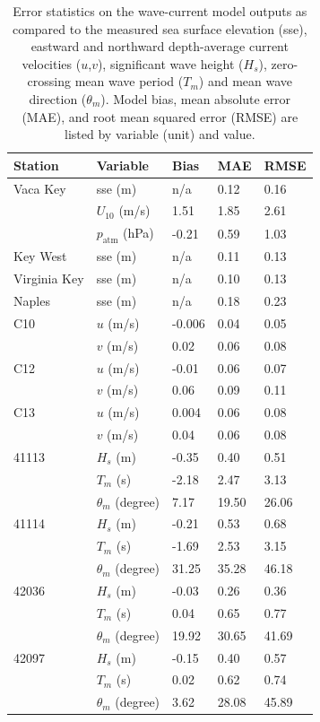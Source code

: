 \documentclass[preprint,12pt,authoryear]{elsarticle}
\begin{document}
\begin{table}
    \centering
    \begin{tabular}{|p{3cm}p{3cm}p{2cm}p{2cm}p{2cm}|}
        \hline
        \textbf{Station} & \textbf{Variable} & \textbf{Bias} & \textbf{MAE} & \textbf{RMSE} \\
        \hline
        Vaca Key     & sse (m)        & n/a  & 0.12 & 0.16 \\
                     & $U_{10}$ (m/s) & 1.51 & 1.85 & 2.61 \\
                     & $p_\text{atm}$ (hPa) & -0.21 & 0.59 & 1.03 \\ 
        Key West     & sse (m)        & n/a  & 0.11 & 0.13 \\
        Virginia Key & sse (m)        & n/a  & 0.10 & 0.13 \\
        Naples       & sse (m)        & n/a  & 0.18 & 0.23 \\
        \hline
        C10  & $u$ (m/s) & -0.006 & 0.04 & 0.05 \\
             & $v$ (m/s) & 0.02   & 0.06 & 0.08 \\
        C12  & $u$ (m/s) & -0.01  & 0.06 & 0.07 \\
             & $v$ (m/s) & 0.06   & 0.09 & 0.11 \\
        C13  & $u$ (m/s) & 0.004  & 0.06 & 0.08 \\
             & $v$ (m/s) & 0.04   & 0.06 & 0.08 \\
        \hline
        41113 & $H_s$ (m) & -0.35 & 0.40 & 0.51 \\
              & $T_m$ (s) & -2.18 & 2.47 & 3.13 \\
              & $\theta_m$ (degree) & 7.17 & 19.50 & 26.06 \\
        41114 & $H_s$ (m) & -0.21 & 0.53 & 0.68 \\
              & $T_m$ (s) & -1.69 & 2.53 & 3.15 \\
              & $\theta_m$ (degree) & 31.25 & 35.28 & 46.18 \\
        42036 & $H_s$ (m) & -0.03 & 0.26 & 0.36 \\
              & $T_m$ (s) & 0.04  & 0.65 & 0.77 \\
              & $\theta_m$ (degree) & 19.92 & 30.65 & 41.69 \\
        42097 & $H_s$ (m) & -0.15 & 0.40 & 0.57 \\
              & $T_m$ (s) & 0.02  & 0.62 & 0.74 \\
              & $\theta_m$ (degree) & 3.62 & 28.08 & 45.89 \\
        \hline
    \end{tabular}
    \caption{Error statistics on the wave-current model outputs as compared to the measured sea surface elevation (sse), eastward and northward depth-average current velocities ($u$,$v$), significant wave height ($H_s$), zero-crossing mean wave period ($T_m$) and mean wave direction ($\theta_m$). Model bias, mean absolute error (MAE), and root mean squared error (RMSE) are listed by variable (unit) and value.}
    \label{tab:stat}
\end{table}
\end{document}
